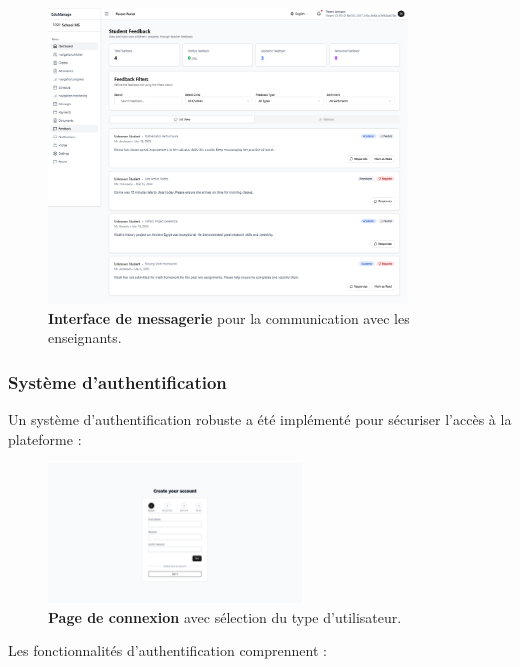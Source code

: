 \begin{figure}[H]
  \centering
  \includegraphics[width=0.85\textwidth,keepaspectratio]{pfe-pics/parent/Screenshot 2025-06-09 at 22-59-25 Vite React TS.png}
  \caption{\textbf{Interface de messagerie} pour la communication avec les enseignants.}
  \label{fig:messaging_interface}
\end{figure}

\subsubsection{Système d'authentification}

Un système d'authentification robuste a été implémenté pour sécuriser l'accès à la plateforme :

\begin{figure}[H]
  \centering
  \includegraphics[width=0.6\textwidth,keepaspectratio]{pfe-pics/auth/Screenshot 2025-06-09 at 23-00-18 Vite React TS.png}
  \caption{\textbf{Page de connexion} avec sélection du type d'utilisateur.}
  \label{fig:login_page}
\end{figure}

Les fonctionnalités d'authentification comprennent :

